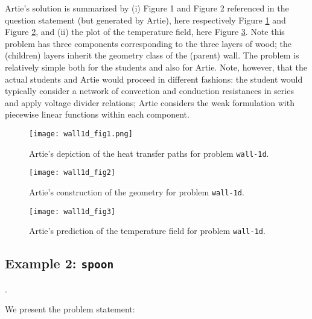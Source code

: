 \documentclass[preprint,12pt]{article}
\begin{document}
Artie's solution is summarized by (i) Figure 1 and Figure 2 referenced in the question statement (but generated by Artie), here respectively Figure \ref{fig:wall-1d_fig1} and Figure \ref{fig:wall-1d_fig2}, and (ii) the plot of the temperature field, here Figure \ref{fig:wall-1d_fig3}. Note this problem has three components corresponding to the three layers of wood; the (children) layers inherit the geometry class of the (parent) wall. The problem is relatively simple both for the students and also for Artie. Note, however, that the actual students and Artie would proceed in different fashions: the student would typically consider a network of convection and conduction resistances in series and apply voltage divider relations; Artie considers the weak formulation with piecewise linear functions within each component.

\begin{figure}[h!]
\begin{center}
 \texttt{[image: wall1d\_fig1.png]}
\end{center}
\caption{Artie's depiction of the heat transfer paths for problem \texttt{wall-1d}.}
\label{fig:wall-1d_fig1}
\end{figure}

\begin{figure}[h!]
\begin{center}
 \texttt{[image: wall1d\_fig2]}
\end{center}
\caption{Artie's construction of the geometry for problem \texttt{wall-1d}.}
\label{fig:wall-1d_fig2}
\end{figure}

\begin{figure}[h!]
\begin{center}
 \texttt{[image: wall1d\_fig3]}
\end{center}
\caption{Artie's prediction of the temperature field for problem \texttt{wall-1d}.}
\label{fig:wall-1d_fig3}
\end{figure}

\subsection{Example 2: \texttt{spoon}}. 

We present the problem statement:
\end{document}
